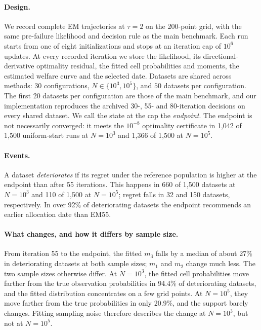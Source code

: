 \paragraph{Design.}
We record complete EM trajectories at $\tau=2$ on the 200-point grid, with the
same pre-failure likelihood and decision rule as the main benchmark.  Each run
starts from one of eight initializations and stops at an iteration cap of
$10^6$ updates.  At every recorded iteration we store the likelihood, its
directional-derivative optimality residual, the fitted cell probabilities and
moments, the estimated welfare curve and the selected date.  Datasets are
shared across methods: $30$ configurations, $N\in\{10^3,10^5\}$, and $50$
datasets per configuration.  The first 20 datasets per configuration are those
of the main benchmark, and our implementation reproduces the archived 30-, 55-
and 80-iteration decisions on every shared dataset.  We call the state at the
cap the \emph{endpoint}.  The endpoint is not necessarily converged: it meets
the $10^{-8}$ optimality certificate in 1{,}042 of 1{,}500 uniform-start runs
at $N=10^3$ and 1{,}366 of 1{,}500 at $N=10^5$.

\paragraph{Events.}
A dataset \emph{deteriorates} if its regret under the reference population is
higher at the endpoint than after 55 iterations.  This happens in 660 of
1{,}500 datasets at $N=10^3$ and 110 of 1{,}500 at $N=10^5$; regret falls in
32 and 150 datasets, respectively.  In over 92\% of deteriorating datasets the
endpoint recommends an earlier allocation date than EM55.

\paragraph{What changes, and how it differs by sample size.}
From iteration 55 to the endpoint, the fitted $m_3$ falls by a median of about
27\% in deteriorating datasets at both sample sizes; $m_1$ and $m_2$ change
much less.  The two sample sizes otherwise differ.  At $N=10^3$, the fitted
cell probabilities move farther from the true observation probabilities in
94.4\% of deteriorating datasets, and the fitted distribution concentrates on
a few grid points.  At $N=10^5$, they move farther from the true probabilities
in only 20.9\%, and the support barely changes.  Fitting sampling noise
therefore describes the change at $N=10^3$, but not at $N=10^5$.

